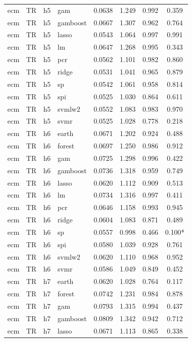 \begin{ThreePartTable}
\begin{longtable}[t]{llclcccc}
ecm & TR & h5 & gam & 0.0638 & 1.249 & 0.992 & 0.359\\
ecm & TR & h5 & gamboost & 0.0667 & 1.307 & 0.962 & 0.764\\
ecm & TR & h5 & lasso & 0.0543 & 1.064 & 0.997 & 0.991\\
ecm & TR & h5 & lm & 0.0647 & 1.268 & 0.995 & 0.343\\
ecm & TR & h5 & pcr & 0.0562 & 1.101 & 0.982 & 0.860\\
ecm & TR & h5 & ridge & 0.0531 & 1.041 & 0.965 & 0.879\\
ecm & TR & h5 & sp & 0.0542 & 1.061 & 0.958 & 0.814\\
ecm & TR & h5 & spi & 0.0525 & 1.030 & 0.864 & 0.611\\
ecm & TR & h5 & svmlw2 & 0.0552 & 1.083 & 0.983 & 0.970\\
ecm & TR & h5 & svmr & 0.0525 & 1.028 & 0.778 & 0.218\\
\addlinespace
ecm & TR & h6 & earth & 0.0671 & 1.202 & 0.924 & 0.488\\
ecm & TR & h6 & forest & 0.0697 & 1.250 & 0.986 & 0.912\\
ecm & TR & h6 & gam & 0.0725 & 1.298 & 0.996 & 0.422\\
ecm & TR & h6 & gamboost & 0.0736 & 1.318 & 0.959 & 0.749\\
ecm & TR & h6 & lasso & 0.0620 & 1.112 & 0.909 & 0.513\\
ecm & TR & h6 & lm & 0.0734 & 1.316 & 0.997 & 0.411\\
ecm & TR & h6 & pcr & 0.0646 & 1.158 & 0.993 & 0.945\\
ecm & TR & h6 & ridge & 0.0604 & 1.083 & 0.871 & 0.489\\
ecm & TR & h6 & sp & 0.0557 & 0.998 & 0.466 & 0.100*\\
ecm & TR & h6 & spi & 0.0580 & 1.039 & 0.928 & 0.761\\
ecm & TR & h6 & svmlw2 & 0.0620 & 1.110 & 0.968 & 0.952\\
ecm & TR & h6 & svmr & 0.0586 & 1.049 & 0.849 & 0.452\\
\addlinespace
ecm & TR & h7 & earth & 0.0620 & 1.028 & 0.764 & 0.117\\
ecm & TR & h7 & forest & 0.0742 & 1.231 & 0.984 & 0.878\\
ecm & TR & h7 & gam & 0.0793 & 1.315 & 0.994 & 0.437\\
ecm & TR & h7 & gamboost & 0.0809 & 1.342 & 0.942 & 0.712\\
ecm & TR & h7 & lasso & 0.0671 & 1.113 & 0.865 & 0.338\\

\end{longtable}
\end{ThreePartTable}
